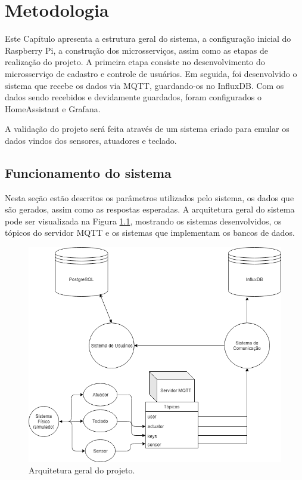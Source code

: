\chapter{Metodologia}

Este Capítulo apresenta a estrutura geral do sistema, a configuração inicial do Raspberry Pi, a construção dos microsserviços, assim como as etapas de realização do projeto. A
primeira etapa consiste no desenvolvimento do microsserviço de cadastro e controle de usuários. Em seguida, foi desenvolvido o sistema que recebe os dados via MQTT, guardando-os no InfluxDB. Com os dados sendo recebidos e devidamente guardados, foram configurados o HomeAssistant e Grafana.

A validação do projeto será feita através de um sistema criado para emular os dados vindos dos sensores, atuadores e teclado. %

\section{Funcionamento do sistema} \label{sec:funcionamento}

Nesta seção estão descritos os parâmetros utilizados pelo sistema, os dados que são gerados, assim como as respostas esperadas. A arquitetura geral do sistema pode ser visualizada na Figura \ref{fig:arqgeral}, mostrando os sistemas desenvolvidos, os tópicos do servidor MQTT e os sistemas que implementam os bancos de dados.

\begin{figure}[htbp]
	\centering
	\includegraphics[width=0.7\linewidth]{figuras/arquiteturaprojeto.png}
	\caption{Arquitetura geral do projeto.}
	\label{fig:arqgeral}
\end{figure}

